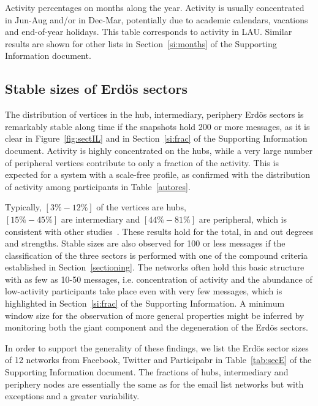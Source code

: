 \documentclass[%
aip,
jmp,%
amsmath,amssymb,
reprint,%
]{revtex4-1}
\begin{document}
\begin{table}
\caption{Activity percentages on months along the year. 	Activity is usually concentrated in Jun-Aug and/or in Dec-Mar, potentially due to academic calendars, vacations and end-of-year holidays. This table corresponds to activity in LAU. Similar results are shown for other lists in Section~\ref*{si:months} of the Supporting Information document.}
\footnotesize

\label{tab:min2}
\end{table}


\subsection{Stable sizes of Erd\"os sectors}\label{subsec:pih}

The distribution of vertices in the hub, intermediary, periphery Erd\"os sectors is remarkably stable along time if the snapshots hold 200 or more messages, as it is clear in Figure~\ref{fig:sectIL} and in Section~\ref*{si:frac} of the Supporting Information document. 
Activity is highly concentrated on the hubs, while a very large number of peripheral vertices contribute to only a fraction of the activity.
This is expected for a system with a scale-free profile, as confirmed with the distribution of activity among participants in Table~\ref{autores}.

Typically, $[3\%-12\%]$ of the vertices are hubs,\\
$[15\%-45\%]$ are intermediary and $[44\%-81\%]$ are peripheral,
which is consistent with other studies~\cite{secFree}.
These results hold for the total, in and out degrees and strengths.
Stable sizes are also observed for 100 or less messages if the classification 
of the three sectors is performed with one of the compound criteria established in Section~\ref{sectioning}. The networks often hold this basic structure with as few as 10-50 messages, i.e. concentration of activity and the abundance of low-activity participants take place even with very few messages, which is highlighted in Section~\ref*{si:frac} of the Supporting Information. A minimum window size for the observation of more general properties might be inferred by monitoring 
both the giant component and the degeneration of the Erd\"os sectors.

In order to support the generality of these findings,
we list the Erd\"os sector sizes of 12 networks from Facebook, Twitter and Participabr in Table~\ref*{tab:secE} of the Supporting Information document. The fractions of hubs, intermediary and periphery nodes are
essentially the same as for the email list networks but with exceptions and a greater variability.
\end{document}
